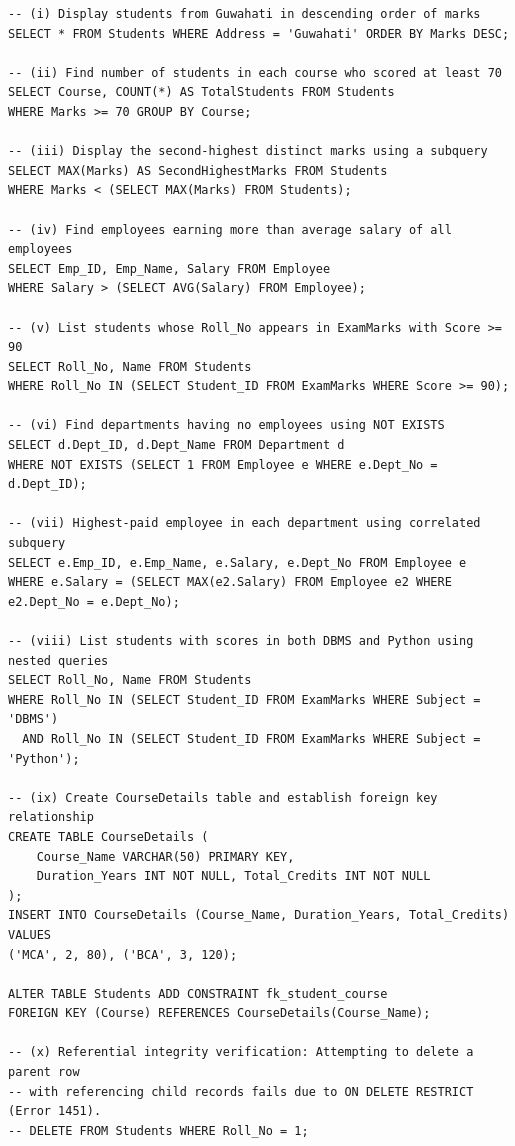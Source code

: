 \begin{lstlisting}[basicstyle=\ttfamily\scriptsize,caption={SQL commands for Exercises (i) through (x)}]
-- (i) Display students from Guwahati in descending order of marks
SELECT * FROM Students WHERE Address = 'Guwahati' ORDER BY Marks DESC;

-- (ii) Find number of students in each course who scored at least 70
SELECT Course, COUNT(*) AS TotalStudents FROM Students
WHERE Marks >= 70 GROUP BY Course;

-- (iii) Display the second-highest distinct marks using a subquery
SELECT MAX(Marks) AS SecondHighestMarks FROM Students
WHERE Marks < (SELECT MAX(Marks) FROM Students);

-- (iv) Find employees earning more than average salary of all employees
SELECT Emp_ID, Emp_Name, Salary FROM Employee
WHERE Salary > (SELECT AVG(Salary) FROM Employee);

-- (v) List students whose Roll_No appears in ExamMarks with Score >= 90
SELECT Roll_No, Name FROM Students
WHERE Roll_No IN (SELECT Student_ID FROM ExamMarks WHERE Score >= 90);

-- (vi) Find departments having no employees using NOT EXISTS
SELECT d.Dept_ID, d.Dept_Name FROM Department d
WHERE NOT EXISTS (SELECT 1 FROM Employee e WHERE e.Dept_No = d.Dept_ID);

-- (vii) Highest-paid employee in each department using correlated subquery
SELECT e.Emp_ID, e.Emp_Name, e.Salary, e.Dept_No FROM Employee e
WHERE e.Salary = (SELECT MAX(e2.Salary) FROM Employee e2 WHERE e2.Dept_No = e.Dept_No);

-- (viii) List students with scores in both DBMS and Python using nested queries
SELECT Roll_No, Name FROM Students
WHERE Roll_No IN (SELECT Student_ID FROM ExamMarks WHERE Subject = 'DBMS')
  AND Roll_No IN (SELECT Student_ID FROM ExamMarks WHERE Subject = 'Python');

-- (ix) Create CourseDetails table and establish foreign key relationship
CREATE TABLE CourseDetails (
    Course_Name VARCHAR(50) PRIMARY KEY,
    Duration_Years INT NOT NULL, Total_Credits INT NOT NULL
);
INSERT INTO CourseDetails (Course_Name, Duration_Years, Total_Credits) VALUES
('MCA', 2, 80), ('BCA', 3, 120);

ALTER TABLE Students ADD CONSTRAINT fk_student_course
FOREIGN KEY (Course) REFERENCES CourseDetails(Course_Name);

-- (x) Referential integrity verification: Attempting to delete a parent row
-- with referencing child records fails due to ON DELETE RESTRICT (Error 1451).
-- DELETE FROM Students WHERE Roll_No = 1;
\end{lstlisting}

